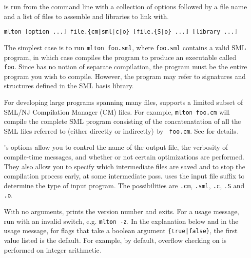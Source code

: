 
{\mlton} is run from the command line with a collection of options followed by a
file name and a list of files to assemble and libraries to link with.
\begin{verbatim}
mlton [option ...] file.{cm|sml|c|o} [file.{S|o} ...] [library ...]
\end{verbatim}
The simplest case is to run {\tt mlton foo.sml}, where {\tt foo.sml} contains a
valid SML program, in which case {\mlton} compiles the program to produce an
executable called {\tt foo}.  Since {\mlton} has no notion of separate
compilation, the program must be the entire program you wish to
compile.  However, the program may refer to signatures and structures
defined in the SML basis library.

For developing large programs spanning many files, {\mlton} supports a limited
subset of SML/NJ Compilation Manager (CM) files.  For example, {\tt mlton
foo.cm} will compile the complete SML program consisting of the concatenatation
of all the SML files referred to (either directly or indirectly) by {\tt
foo.cm}.  See  for details.


{\mlton}'s options allow you to control the name of the output file, the
verbosity of compile-time messages, and whether or not certain optimizations are
performed.  They also allow you to specify which intermediate files are saved
and to stop the compilation process early, at some intermediate pass.  {\mlton}
uses the input file suffix to determine the type of input program.  The
possibilities are {\tt .cm}, {\tt .sml}, {\tt .c}, {\tt .S} and {\tt .o}.

With no arguments, {\mlton} prints the version number and exits.  For
a usage message, run {\mlton} with an invalid switch, e.g. {\tt mlton
-z}.  In the explanation below and in the usage message, for flags
that take a boolean argument {\tt \{true|false\}}, the first value
listed is the default.  For example, by default, overflow checking on
is performed on integer arithmetic.

\newcommand{\option}[1]{\item[{\tt #1}]\hspace{1em}\\}

